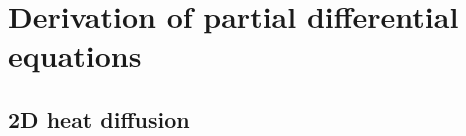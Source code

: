 \documentclass[a4paper,12pt,twoside]{article}
\begin{document}
\section{Derivation of partial differential equations}
\subsection{2D heat diffusion}

\end{document}
